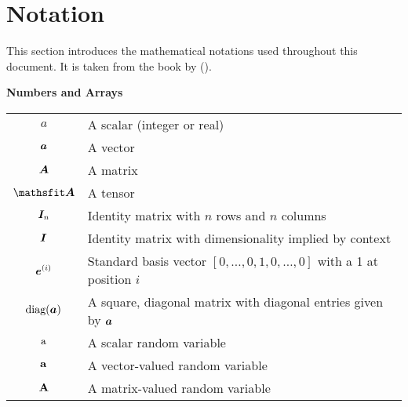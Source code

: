 \section{Notation}
\label{notation}
This section introduces the mathematical notations used throughout this document. It is taken from the book  by \citeauthor{goodfellow:dlbook} (\citeyear{goodfellow:dlbook}).

\vspace{\notationgap}
\begin{minipage}{\textwidth}
	\centerline{\bf Numbers and Arrays}
	\bgroup
	\def\arraystretch{1.5}
	\begin{tabular}{cp{3.25in}}
		$\displaystyle a$ & A scalar (integer or real)\\
		$\displaystyle {\bm{a}}$ & A vector\\
		$\displaystyle {\bm{A}}$ & A matrix\\
		$\displaystyle \tA$ & A tensor\\
		$\displaystyle {\bm{I}}_n$ & Identity matrix with $n$ rows and $n$ columns\\
		$\displaystyle {\bm{I}}$ & Identity matrix with dimensionality implied by context\\
		$\displaystyle {\bm{e}}^{(i)}$ & Standard basis vector $[0,\dots,0,1,0,\dots,0]$ with a 1 at position $i$\\
		$\displaystyle \text{diag}({\bm{a}})$ & A square, diagonal matrix with diagonal entries given by ${\bm{a}}$\\
		$\displaystyle {\textnormal{a}}$ & A scalar random variable\\
		$\displaystyle {\mathbf{a}}$ & A vector-valued random variable\\
		$\displaystyle {\mathbf{A}}$ & A matrix-valued random variable\\
	\end{tabular}
	\egroup
\end{minipage}

